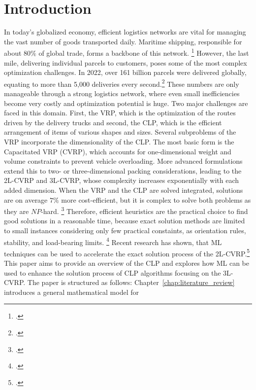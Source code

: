 \chapter{Introduction}
\label{sec:introduction}
In today’s globalized economy, efficient logistics networks are vital for managing the vast number of
goods transported daily. Maritime shipping, responsible for about $80\%$ of global trade,
forms a backbone of this network. \footcite[cf.][]{un_trade_and_development_unctad_review_2024}
However, the last mile, delivering individual parcels to customers, poses some of the most complex optimization
challenges. In 2022, over 161 billion parcels were delivered globally, equating to more than 5,000
deliveries every second.\footcite[cf.][]{statista_global_2022}
These numbers are only manageable through a strong logistics network, where even small inefficiencies
become very costly and optimization potential is huge. Two major challenges are faced in this domain.
First, the \gls{VRP}, which is the optimization of the routes driven by the delivery trucks and second,
the \gls{CLP}, which is the efficient arrangement of items of various shapes and sizes.
Several subproblems of the \gls{VRP} incorporate the dimensionality of the \gls{CLP}. The most basic form is the Capacitated VRP (CVRP),
which accounts for one-dimensional weight and volume constraints to prevent vehicle overloading.
More advanced formulations extend this to two- or three-dimensional packing considerations,
leading to the \gls{2L-CVRP} and \gls{3L-CVRP}, whose complexity increases exponentially with each added dimension.
When the \gls{VRP} and the \gls{CLP} are solved integrated,
solutions are on average $7\%$ more cost-efficient, but it is complex to solve
both problems as they are $NP$-hard. \footcite[cf.][p. 23]{cote_value_2016} Therefore, efficient heuristics are the practical
choice to find good solutions in a reasonable time, because exact solution methods are limited to
small instances considering only few practical constaints, as orientation rules, stability, and load-bearing limits. \footcite[cf.][p. 377f]{bischoff_issues_1995}
Recent research has shown, that \gls{ML} techniques can be used to accelerate the exact solution process
of the \gls{2L-CVRP}.\footcite[cf.][]{zhang_learning-based_2022}
This paper aims to provide an overview of the \gls{CLP} and explores how \gls{ML} can be used
to enhance the solution process of \gls{CLP} algorithms focusing on the \gls{3L-CVRP}.
The paper is structured as follows:
Chapter~\ref{chap:literature_review} introduces a general mathematical model for
